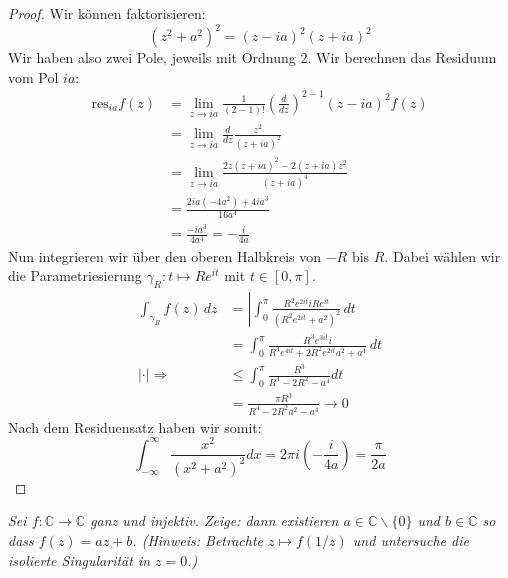 \documentclass[11pt]{article}
\newcommand{\res}{\text{res}}
\newenvironment{problem}[2][Beispiel]{
    \begin{trivlist}
        \item[\hskip \labelsep {\bfseries #1}\hskip \labelsep {\bfseries #2.}] \itshape}{
    \end{trivlist}\normalshape
}
\begin{document}
    \begin{proof}
        Wir können faktorisieren:
        $$(z^2+a^2)^2 = (z-ia)^2 (z+ia)^2$$
        Wir haben also zwei Pole, jeweils mit Ordnung $2$. Wir berechnen das
        Residuum vom Pol $ia$:
        $$\begin{aligned}
              \res_{ia} f(z) &= \lim_{z\to ia}\frac{1}{(2-1)!}\left(\frac{d}{dz}\right)^{2-1}
              (z-ia)^2 f(z) \\&= \lim_{z\to ia}\frac{d}{dz}\frac{z^2}{(z+ia)^2} \\&=
              \lim_{z\to ia}\frac{2z(z+ia)^2- 2(z+ia)z^2}{(z+ia)^4}\\& =
              \frac{2ia(-4a^2)+4ia^3}{16a^4} \\&= \frac{-ia^3}{4a^4} = -\frac{i}{4a}
        \end{aligned}$$
        Nun integrieren wir über den oberen Halbkreis von $-R$ bis $R$. Dabei wählen wir
        die Parametriesierung $\gamma_R: t\mapsto Re^{it}$ mit $t\in [0,\pi]$.
        $$\begin{aligned}
              \int_{\gamma_R} f(z) \, dz &=
              \left|\int_0^{\pi}\frac{R^2e^{2it}iRe^{it}}{(R^2e^{2it}+a^2)^2}\, dt \\
              &= \int_0^{\pi}\frac{R^3e^{3it}i}{R^4e^{4it}+2R^2e^{2it}a^2+a^4}\, dt \\
              |\cdot |\Rightarrow &\leq \int_0^{\pi}\frac{R^3}{R^4 -2R^2-a^4}dt \\
              &= \frac{\pi R^3}{R^4 -2R^2 a^2 -a^4 }\to 0
        \end{aligned}$$
        Nach dem Residuensatz haben wir somit:
        $$\int_{-\infty}^{\infty} \frac{x^2}{\left(x^2+a^2\right)^2} d x=
        2\pi i \left(-\frac{i}{4a}\right)= \frac{\pi}{2a}$$
    \end{proof}

    \begin{problem}{3}
        Sei $f: \mathbb{C} \rightarrow \mathbb{C}$ ganz und injektiv. Zeige: dann existieren $a \in \mathbb{C} \backslash\{0\}$ und $b \in \mathbb{C}$ so dass $f(z)=a z+b$.
        (Hinweis: Betrachte $z \mapsto f(1 / z)$ und untersuche die isolierte Singularität in $z=0$.)
    \end{problem}
\end{document}
